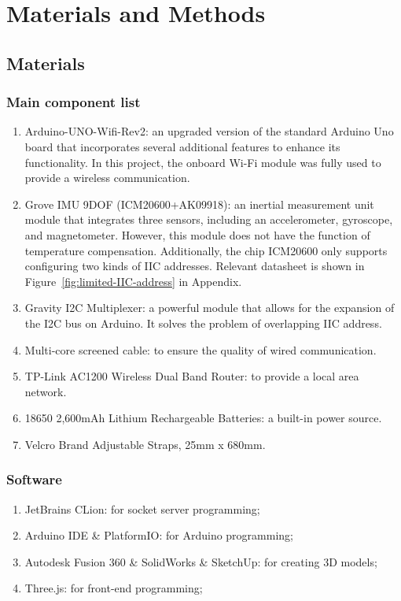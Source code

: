 \chapter{Materials and Methods}


\section{Materials}


\subsection{Main component list}
\begin{enumerate}
	\item   Arduino-UNO-Wifi-Rev2: an upgraded version of the standard Arduino Uno board that incorporates several additional features to enhance its functionality.
	In this project, the onboard Wi-Fi module was fully used to provide a wireless communication.
	\item   Grove IMU 9DOF (ICM20600+AK09918): an inertial measurement unit module that integrates three sensors, including an accelerometer, gyroscope, and magnetometer.
	However, this module does not have the function of temperature compensation.
	Additionally, the chip ICM20600 only supports configuring two kinds of IIC addresses.
	Relevant datasheet is shown in Figure~\ref{fig:limited-IIC-address} in Appendix.
	\item   Gravity I2C Multiplexer: a powerful module that allows for the expansion of the I2C bus on Arduino.
	It solves the problem of overlapping IIC address.
	\item   Multi-core screened cable: to ensure the quality of wired communication.
	\item   TP-Link AC1200 Wireless Dual Band Router: to provide a local area network.
	\item   18650 2,600mAh Lithium Rechargeable Batteries: a built-in power source.
	\item   Velcro Brand Adjustable Straps, 25mm x 680mm.
\end{enumerate}


\subsection{Software}
\begin{enumerate}
	\item JetBrains CLion: for socket server programming;
	\item Arduino IDE \& PlatformIO: for Arduino programming;
	\item Autodesk Fusion 360 \& SolidWorks \& SketchUp: for creating 3D models;
	\item Three.js: for front-end programming;
\end{enumerate}


